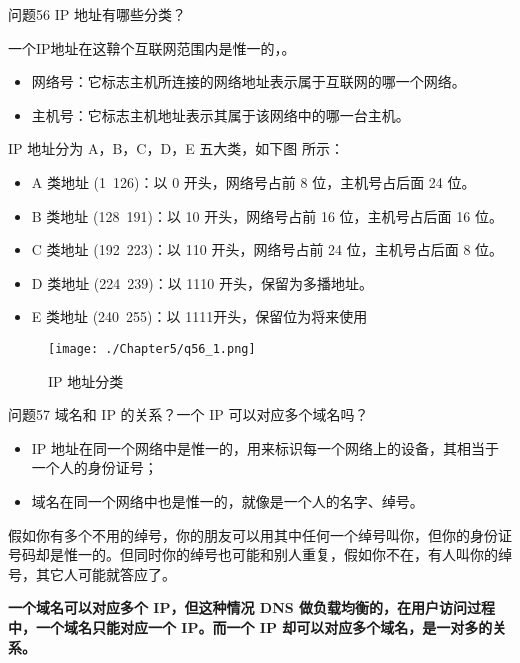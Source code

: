 \documentclass[cn,11pt,color=blue,lang=cn]{elegantbook}
\begin{document}
\begin{custom}{问题56}
IP 地址有哪些分类？
\end{custom}
\begin{solution}
一个IP地址在这鞥个互联网范围内是惟一的，。
\begin{itemize}
	\item 网络号：它标志主机所连接的网络地址表示属于互联网的哪一个网络。
	\item 主机号：它标志主机地址表示其属于该网络中的哪一台主机。
\end{itemize}
IP 地址分为 A，B，C，D，E 五大类，如下图 所示：
\begin{itemize}
	\item A 类地址 (1~126)：以 0 开头，网络号占前 8 位，主机号占后面 24 位。
	\item B 类地址 (128~191)：以 10 开头，网络号占前 16 位，主机号占后面 16 位。
	\item C 类地址 (192~223)：以 110 开头，网络号占前 24 位，主机号占后面 8 位。
	\item D 类地址 (224~239)：以 1110 开头，保留为多播地址。
	\item E 类地址 (240~255)：以 1111开头，保留位为将来使用
\end{itemize}

\begin{figure}[!h]
\centering
\texttt{[image: ./Chapter5/q56\_1.png]}
\caption{IP 地址分类}
\label{fig56_1}
\end{figure}
\end{solution}

\begin{custom}{问题57}
域名和 IP 的关系？一个 IP 可以对应多个域名吗？
\end{custom}

\begin{solution}
\begin{itemize}
	\item IP 地址在同一个网络中是惟一的，用来标识每一个网络上的设备，其相当于一个人的身份证号；
	\item 域名在同一个网络中也是惟一的，就像是一个人的名字、绰号。
\end{itemize}
假如你有多个不用的绰号，你的朋友可以用其中任何一个绰号叫你，但你的身份证号码却是惟一的。但同时你的绰号也可能和别人重复，假如你不在，有人叫你的绰号，其它人可能就答应了。

\textbf{一个域名可以对应多个 IP，但这种情况 DNS 做负载均衡的，在用户访问过程中，一个域名只能对应一个 IP。而一个 IP 却可以对应多个域名，是一对多的关系。}
\end{solution}
\end{document}
